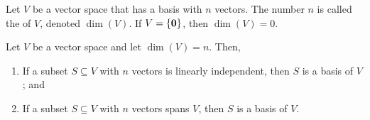 \begin{defn}
Let $ V $ be a vector space that has a basis with $ n $ vectors. The number $ n $ is called the  of $ V $, denoted $ \dim(V) $. If $ V=\{\mathbf{0}\} $, then $ \dim(V)=0 $.
\end{defn}

\begin{thm}
Let $ V $ be a vector space and let $ \dim(V)=n $. Then,
\begin{enumerate}
    \item If a subset $ S\subseteq V $ with $ n $ vectors is linearly independent, then $ S $ is a basis of $ V $; and
    \item If a subset $ S\subseteq V $ with $ n $ vectors spans $ V $, then $ S $ is a basis of $ V $.
\end{enumerate}
\end{thm}
